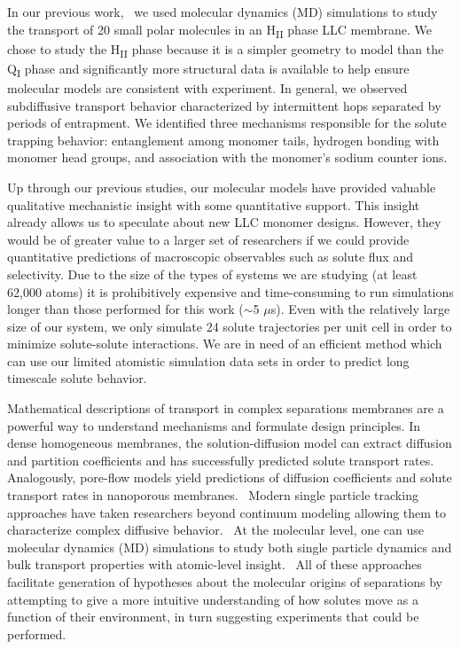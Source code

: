 \documentclass[journal=jctcce,manuscript=article]{achemso}
\begin{document}
  In our previous work,~\cite{coscia_chemically_2019} we used molecular
  dynamics (MD) simulations to study the transport of 20 small polar molecules
  in an H\textsubscript{II} phase LLC membrane. We chose to study the
  H\textsubscript{II} phase because it is a simpler geometry to model than the
  Q\textsubscript{I} phase and significantly more structural data is available
  to help ensure molecular models are consistent with experiment. In general,
  we observed subdiffusive transport behavior characterized by intermittent
  hops separated by periods of entrapment. We identified three mechanisms
  responsible for the solute trapping behavior: entanglement among monomer
  tails, hydrogen bonding with monomer head groups, and association with the
  monomer's sodium counter ions.
  
  Up through our previous studies, our molecular models have provided valuable
  qualitative mechanistic insight with some quantitative support. This insight
  already allows us to speculate about new LLC monomer designs. However, they
  would be of greater value to a larger set of researchers if we could provide
  quantitative predictions of macroscopic observables such as solute flux and
  selectivity. Due to the size of the types of systems we are studying (at
  least 62,000 atoms) it is prohibitively expensive and time-consuming to run
  simulations longer than those performed for this work ($\sim$5 $\mu$s). Even
  with the relatively large size of our system, we only simulate 24 solute
  trajectories per unit cell in order to minimize solute-solute interactions.
  We are in need of an efficient method which can use our limited atomistic 
  simulation data sets in order to predict long timescale solute behavior.  

  Mathematical descriptions of transport in complex separations membranes are a
  powerful way to understand mechanisms and formulate design principles.
  \cite{vinh-thang_predictive_2013,geens_transport_2006,darvishmanesh_mass_2016}
  In dense homogeneous membranes, the solution-diffusion model
  can extract diffusion and partition coefficients and has successfully
  predicted solute transport rates.~\cite{wijmans_solution-diffusion_1995}
  Analogously, pore-flow models yield predictions of diffusion coefficients and
  solute transport rates in nanoporous membranes.~\cite{paul_diffusive_1974}
  Modern single particle tracking approaches have taken researchers beyond
  continuum modeling allowing them to characterize complex diffusive
  behavior.~\cite{manzo_review_2015} At the molecular level, one can use
  molecular dynamics (MD) simulations to study both single particle dynamics
  and bulk transport properties with atomic-level
  insight.~\cite{coscia_chemically_2019,maginn_best_2018} All of these
  approaches facilitate generation of hypotheses about the molecular origins of
  separations by attempting to give a more intuitive understanding of how
  solutes move as a function of their environment, in turn suggesting
  experiments that could be performed.
\end{document}
